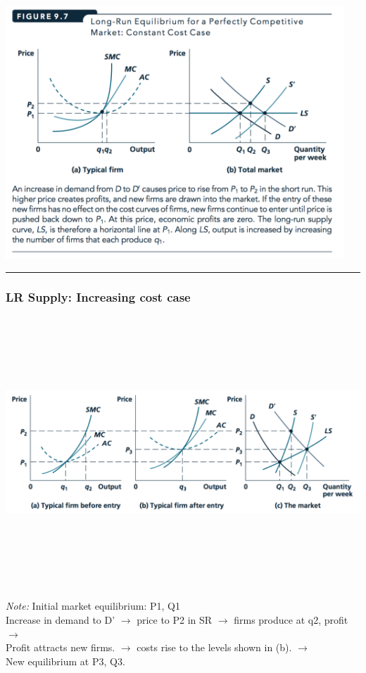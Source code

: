 \documentclass[]{article}
\begin{document}
\includegraphics[width=5in]{picsfigs/LR_constantcost.png}

\begin{center}\rule{0.5\linewidth}{\linethickness}\end{center}

\hypertarget{lr-supply-increasing-cost-case}{%
\subsubsection{LR Supply: Increasing cost case}\label{lr-supply-increasing-cost-case}}

\includegraphics[height=4in]{picsfigs/incrcosts_lrsupply.png}

\emph{Note:}
Initial market equilibrium: P1, Q1\\
Increase in demand to D' \(\rightarrow\) price to P2 in SR \(\rightarrow\) firms produce at q2, profit \(\rightarrow\)\\
Profit attracts new firms. \(\rightarrow\) costs rise to the levels shown in (b). \(\rightarrow\)\\
New equilibrium at P3, Q3.
\end{document}
